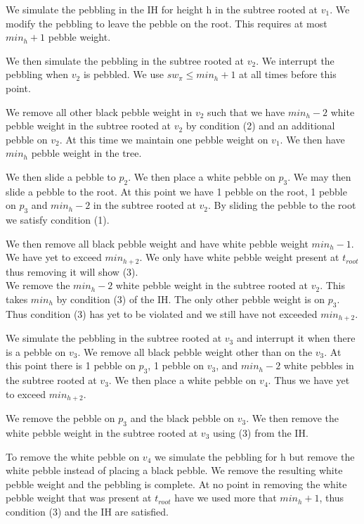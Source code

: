 \documentclass[12pt]{article}
\newcommand{\troot}{t_{root}}
\begin{document}
We simulate the pebbling in the IH for height h in the subtree rooted at $v_1$. We modify the pebbling to leave the pebble on the root. This requires at most $min_h+1$ pebble weight.

We then simulate the pebbling in the subtree rooted at $v_2$. We interrupt the pebbling when $v_2$ is pebbled. We use $sw_\pi \leq min_h + 1$ at all times before this point.

We remove all other black pebble weight in $v_2$ such that we have $min_h - 2$ white pebble weight in the subtree rooted at $v_2$ by condition (2) and an additional pebble on $v_2$. At this time we maintain one pebble weight on $v_1$. We then have $min_h$ pebble weight in the tree.

We then slide a pebble to $p_2$. We then place a white pebble on $p_3$. We may then slide a pebble to the root. At this point we have 1 pebble on the root, 1 pebble on $p_3$ and $min_h - 2$ in the subtree rooted at $v_2$. By sliding the pebble to the root we satisfy condition (1). 

We then remove all black pebble weight and have white pebble weight $min_h - 1$. We have yet to exceed $min_{h+2}$. We only have white pebble weight present at $\troot$ thus removing it will show (3).\\

We remove the $min_h - 2$ white pebble weight in the subtree rooted at $v_2$. This takes $min_h$ by condition (3) of the IH. The only other pebble weight is on $p_3$. Thus condition (3) has yet to be violated and we still have not exceeded $min_{h+2}$.

We simulate the pebbling in the subtree rooted at $v_3$ and interrupt it when there is a pebble on $v_3$. We remove all black pebble weight other than on the $v_3$. At this point there is 1 pebble on $p_3$, 1 pebble on $v_3$, and $min_h - 2$ white pebbles in the subtree rooted at $v_3$. We then place a white pebble on $v_4$. Thus we have yet to exceed $min_{h+2}$.

We remove the pebble on $p_3$ and the black pebble on $v_3$. We then remove the white pebble weight in the subtree rooted at $v_3$ using (3) from the IH.

To remove the white pebble on $v_4$ we simulate the pebbling for h but remove the white pebble instead of placing a black pebble. We remove the resulting white pebble weight and the pebbling is complete. At no point in removing the white pebble weight that was present at $\troot$ have we used more that $min_h+1$, thus condition (3) and the IH are satisfied.\\\\
\end{document}
